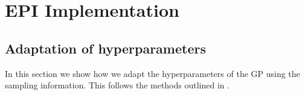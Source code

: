 \documentclass[phd,tocprelim]{cornell}
\begin{document}

%
%
%
%


\chapter{EPI Implementation} %
\label{cha:EPI Implementation}

\section{Adaptation of hyperparameters} %
\label{sec:Adaptation of hyperparameters}

In this section we show how we adapt the hyperparameters of the GP using the sampling information. This follows the methods outlined in \cite{RW}.
\end{document}
